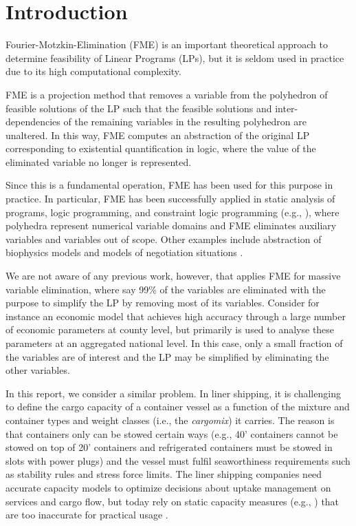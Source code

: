 
\section{Introduction}

Fourier-Motzkin-Elimination (FME) is an important theoretical approach to determine feasibility of Linear Programs (LPs), but it is seldom used in practice due to its high computational complexity.

FME is a projection method that removes a variable from the polyhedron of feasible solutions of the LP such that the feasible solutions and inter-dependencies of the remaining variables in the resulting polyhedron are unaltered. In this way, FME computes an abstraction of the original LP corresponding to existential quantification in logic, where the value of the eliminated variable no longer is represented.

Since this is a fundamental operation, FME has been used for this purpose in practice. 
In particular, FME has been successfully applied in static analysis of programs, logic programming, and constraint logic programming (e.g., \cite{fouilhe,cousot78,benoy05,simon10,jaffar93}), where polyhedra represent 
numerical variable domains and FME eliminates auxiliary variables and variables out of scope. Other examples include abstraction of biophysics models and models of negotiation situations \cite{lukatskii08}.

We are not aware of any previous work, however, that applies FME for massive variable elimination, where say 99\% of the variables are eliminated with the purpose to simplify the LP by removing most of its variables. Consider for instance an economic model that achieves high accuracy through a large number of economic parameters at county level, but primarily is used to analyse these parameters at an aggregated national level. In this case, only a small fraction of the variables are of interest and the LP may be simplified by eliminating the other variables.

In this report, we consider a similar problem. In liner shipping, it is challenging to define the cargo capacity of a container vessel as a function of the mixture and container types and weight classes (i.e., the {\em cargomix}) it carries. The reason is that containers only can be stowed certain ways (e.g., 40' containers cannot be stowed on top of 20' containers and refrigerated containers must be stowed in slots with power plugs) and the vessel must fulfil seaworthiness requirements such as stability rules and stress force limits. The liner shipping companies need accurate capacity models to optimize decisions about uptake management on services and cargo flow, but today rely on static capacity measures (e.g., \cite{ting04,feng08,zurheide13}) that are too inaccurate  for practical usage \cite{AlbertosThesis}.

